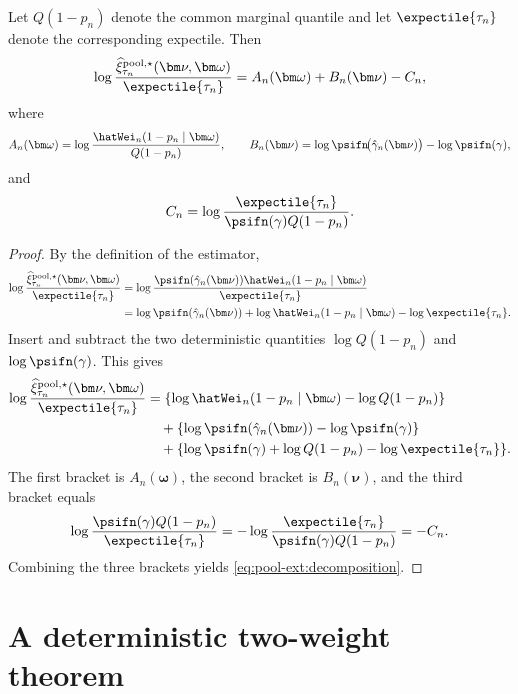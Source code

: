 \begin{lemma}
\label{lem:pool-ext:decomposition}
Let \(Q(1-p_n)\) denote the common marginal quantile and let
\(\expectile{\tau_n}\) denote the corresponding expectile. Then
\begin{equation}
\label{eq:pool-ext:decomposition}
  \log
  \frac{
    \widehat\xi_{\tau_n}^{\mathrm{pool},\star}(\bm\nu,\bm\omega)
  }{\expectile{\tau_n}}
  =
  A_n(\bm\omega)+B_n(\bm\nu)-C_n,
\end{equation}
where
\[
  A_n(\bm\omega)
  =
  \log\frac{\hatWei_n(1-p_n\mid\bm\omega)}{Q(1-p_n)},
  \qquad
  B_n(\bm\nu)
  =
  \log\psifn\!\big(\hat\gamma_n(\bm\nu)\big)-\log\psifn(\gamma),
\]
and
\[
  C_n
  =
  \log
  \frac{\expectile{\tau_n}}{\psifn(\gamma)Q(1-p_n)}.
\]
\end{lemma}

\begin{proof}
By the definition of the estimator,
\[
\begin{aligned}
  \log
  \frac{
    \widehat\xi_{\tau_n}^{\mathrm{pool},\star}(\bm\nu,\bm\omega)
  }{\expectile{\tau_n}}
  &=
  \log
  \frac{
    \psifn(\hat\gamma_n(\bm\nu))
    \hatWei_n(1-p_n\mid\bm\omega)
  }{\expectile{\tau_n}}  \\
  &=
  \log\psifn(\hat\gamma_n(\bm\nu))
  +
  \log\hatWei_n(1-p_n\mid\bm\omega)
  -
  \log\expectile{\tau_n}.
\end{aligned}
\]
Insert and subtract the two deterministic quantities
\(\log Q(1-p_n)\) and \(\log\psifn(\gamma)\). This gives
\[
\begin{aligned}
  \log
  \frac{
    \widehat\xi_{\tau_n}^{\mathrm{pool},\star}(\bm\nu,\bm\omega)
  }{\expectile{\tau_n}}
  &=
  \{\log\hatWei_n(1-p_n\mid\bm\omega)-\log Q(1-p_n)\}  \\
  &\quad
  +
  \{\log\psifn(\hat\gamma_n(\bm\nu))-\log\psifn(\gamma)\}  \\
  &\quad
  +
  \{\log\psifn(\gamma)+\log Q(1-p_n)-\log\expectile{\tau_n}\}.
\end{aligned}
\]
The first bracket is \(A_n(\bm\omega)\), the second bracket is
\(B_n(\bm\nu)\), and the third bracket equals
\[
  \log
  \frac{\psifn(\gamma)Q(1-p_n)}{\expectile{\tau_n}}
  =
  -\log
  \frac{\expectile{\tau_n}}{\psifn(\gamma)Q(1-p_n)}
  =
  -C_n.
\]
Combining the three brackets yields \eqref{eq:pool-ext:decomposition}.
\end{proof}

\section{A deterministic two-weight theorem}
\label{sec:pool-ext:deterministic}

